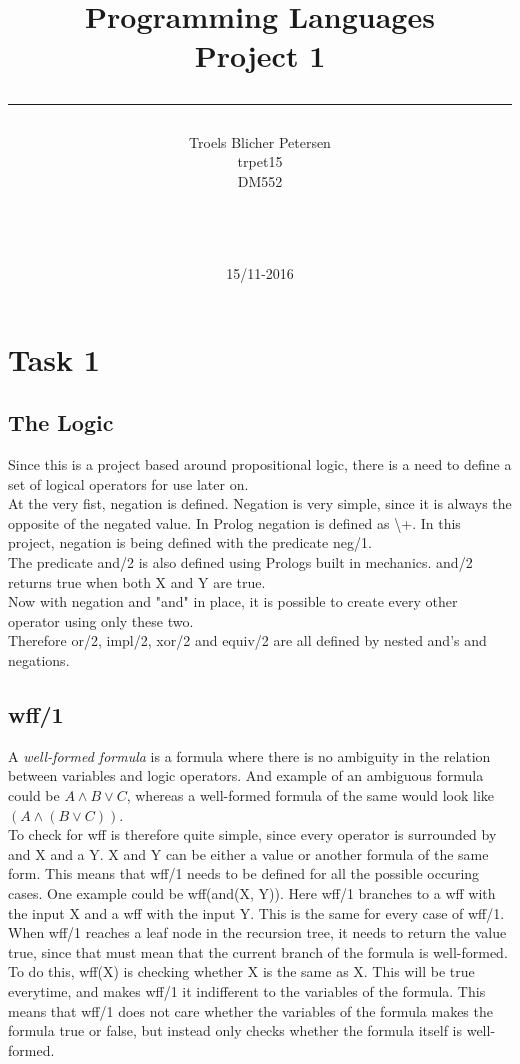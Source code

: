 \documentclass[a4paper,10pt]{article}
\title{Programming Languages \\Project 1 \\\rule{10cm}{0.5mm}}
\author{Troels Blicher Petersen\\trpet15
\\ DM552\\\rule{5.5cm}{0.5mm}\\}
\date{15/11-2016}
\begin{document}
\maketitle

\vfill

\newpage
\tableofcontents

\newpage
\section{Task 1}
\subsection{The Logic}
Since this is a project based around propositional logic, there is a need to define a set of logical operators for use later on. \\
At the very fist, negation is defined. Negation is very simple, since it is always the opposite of the negated value. In Prolog negation is defined as \textbackslash +. In this project, negation is being defined with the predicate \textsf{neg/1}.\\
The predicate \textsf{and/2} is also defined using Prologs built in mechanics. \textsf{and/2} returns true when both X and Y are true.\\
Now with negation and "and" in place, it is possible to create every other operator using only these two.\\
Therefore \textsf{or/2}, \textsf{impl/2}, \textsf{xor/2} and \textsf{equiv/2} are all defined by nested and's and negations.
\subsection{wff/1}
A \textit{well-formed formula} is a formula where there is no ambiguity in the relation between variables and logic operators. And example of an ambiguous formula could be $A \land B \lor C$, whereas a well-formed formula of the same would look like $(A \land (B \lor C))$.\\
To check for wff is therefore quite simple, since every operator is surrounded by and X and a Y. X and Y can be either a value or another formula of the same form. This means that \textsf{wff/1} needs to be defined for all the possible occuring cases. One example could be \textsf{wff(and(X, Y))}. Here \textsf{wff/1} branches to a wff with the input X and a wff with the input Y. This is the same for every case of \textsf{wff/1}. When \textsf{wff/1} reaches a leaf node in the recursion tree, it needs to return the value true, since that must mean that the current branch of the formula is well-formed. To do this, \textsf{wff(X)} is checking whether X is the same as X. This will be true everytime, and makes \textsf{wff/1} it indifferent to the variables of the formula. This means that \textsf{wff/1} does not care whether the variables of the formula makes the formula true or false, but instead only checks whether the formula itself is well-formed.
\end{document}
